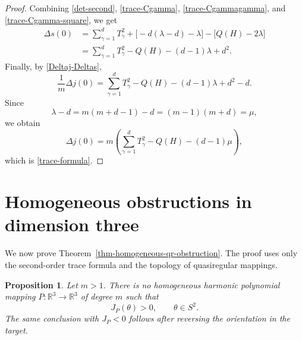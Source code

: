 \documentclass[10pt]{amsart}
\numberwithin{equation}{section}
\newtheorem{proposition}[theorem]{Proposition}
\theoremstyle{definition}
\newcommand{\R}{\mathbb R}
\begin{document}
\begin{proof}
Combining \eqref{det-second}, \eqref{trace-Cgamma},
\eqref{trace-Cgammagamma}, and \eqref{trace-Cgamma-square}, we get
\[
\begin{aligned}
        \Delta s(0)
        &=
        \sum_{\gamma=1}^{d}T_\gamma^2
        +
        \bigl[-d(\lambda-d)-\lambda\bigr]
        -
        \bigl[Q(H)-2\lambda\bigr]  \\
        &=
        \sum_{\gamma=1}^{d}T_\gamma^2
        -
        Q(H)
        -
        (d-1)\lambda
        +
        d^2 .
\end{aligned}
\]
Finally, by \eqref{Deltaj-Deltas},
\[
        \frac1m\Delta j(0)
        =
        \sum_{\gamma=1}^{d}T_\gamma^2
        -
        Q(H)
        -
        (d-1)\lambda
        +
        d^2-d.
\]
Since
\[
        \lambda-d=m(m+d-1)-d=(m-1)(m+d)=\mu,
\]
we obtain
\[
        \Delta j(0)
        =
        m\left(
          \sum_{\gamma=1}^{d}T_\gamma^2
          -
          Q(H)
          -
          (d-1)\mu
        \right),
\]
which is \eqref{trace-formula}.
\end{proof}

\section{Homogeneous obstructions in dimension three}
\label{sec-obstruction}

We now prove Theorem~\ref{thm-homogeneous-qr-obstruction}. The proof uses
only the second-order trace formula and the topology of quasiregular
mappings.

\begin{proposition}
\label{prop-no-positive-homogeneous-jacobian-R3}
Let \(m>1\). There is no homogeneous harmonic polynomial mapping
\(P:\R^3\to\R^3\) of degree \(m\) such that
\[
        J_P(\theta)>0,
        \qquad
        \theta\in S^2.
\]
The same conclusion with \(J_P<0\) follows after reversing the orientation in
the target.
\end{proposition}
\end{document}
